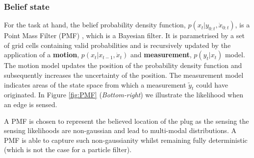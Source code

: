 \subsubsection{Belief state}
For the task at hand, the belief probability density function,  $p(x_t|y_{0:t},\dot{x}_{0:t})$,  
is a Point Mass Filter (PMF) \cite[p.87]{Bergman99recursivebayesian}, which is a  Bayesian filter.
It is parametrised by a set of grid cells containing valid probabilities 
and is recursively updated by the application of a \textbf{motion}, $p(x_t|x_{t-1},\dot{x}_t)$ 
and \textbf{measurement}, $p(y_t|x_t)$ model. The motion model updates the position of the probability density function 
and subsequently increases the uncertainty of the position.  The measurement model indicates areas 
of the state space from which a measurement $\tilde{y}_t$ could have originated. 
In Figure \ref{fig:PMF} (\textit{Bottom-right}) we illustrate the likelihood when an edge is sensed.

A PMF is chosen to represent the believed location of the plug as the sensing 
the sensing likelihoods are non-gaussian and lead to multi-modal distributions.  
A PMF is able to capture such non-gaussianity whilst remaining fully deterministic 
(which is not the case for a particle filter).

